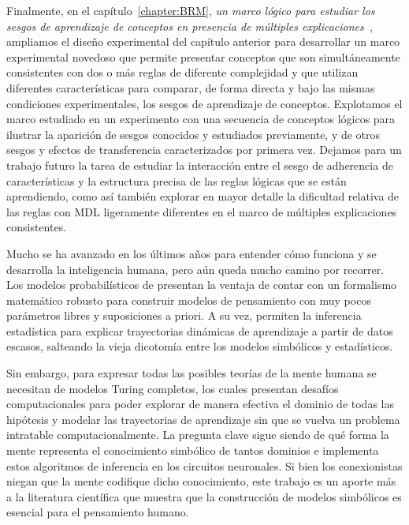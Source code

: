 Finalmente, en el capítulo~\ref{chapter:BRM}, \textit{un marco lógico para estudiar los sesgos de aprendizaje de conceptos en presencia de múltiples explicaciones~\cite{tano2021framework}}, ampliamos el diseño experimental del capítulo anterior para desarrollar un marco experimental novedoso que permite presentar conceptos que son simultáneamente consistentes con dos o más reglas de diferente complejidad y que utilizan diferentes características para comparar, de forma directa y bajo las mismas condiciones experimentales, los sesgos de aprendizaje de conceptos. Explotamos el marco estudiado en un experimento con una secuencia de conceptos lógicos para ilustrar la aparición de sesgos conocidos y estudiados previamente, y de otros sesgos y efectos de transferencia caracterizados por primera vez. Dejamos para un trabajo futuro la tarea de estudiar la interacción entre el sesgo de adherencia de características y la estructura precisa de las reglas lógicas que se están aprendiendo, como así también explorar en mayor detalle la dificultad relativa de las reglas con MDL ligeramente diferentes en el marco de múltiples explicaciones consistentes.

\bigskip

Mucho se ha avanzado en los últimos años para entender cómo funciona y se desarrolla la inteligencia humana, pero aún queda mucho camino por recorrer. Los modelos probabilísticos de \lot presentan la ventaja de contar con un formalismo matemático robusto para construir modelos de pensamiento con muy pocos parámetros libres y suposiciones a priori. A su vez, permiten la inferencia estadística para explicar trayectorias dinámicas de aprendizaje a partir de datos escasos, salteando la vieja dicotomía entre los modelos simbólicos y estadísticos.

Sin embargo, para expresar todas las posibles teorías de la mente humana se necesitan de modelos \lot Turing completos, los cuales presentan desafíos computacionales para poder explorar de manera efectiva el dominio de todas las hipótesis y modelar las trayectorias de aprendizaje sin que se vuelva un problema intratable computacionalmente. La pregunta clave sigue siendo de qué forma la mente representa el conocimiento simbólico de tantos dominios e implementa estos algoritmos de inferencia en los circuitos neuronales. Si bien los conexionistas niegan que la mente codifique dicho conocimiento, este trabajo es un aporte más a la literatura científica que muestra que la construcción de modelos simbólicos es esencial para el pensamiento humano.